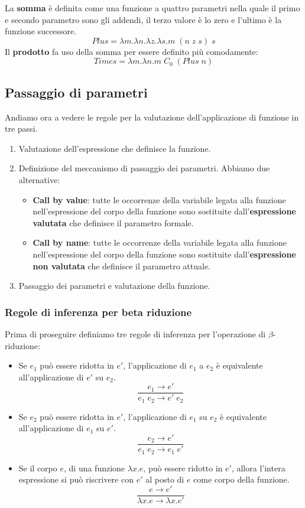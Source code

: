 La \textbf{somma} è definita come una funzione a quattro parametri nella quale il primo e secondo parametro sono gli
addendi, il terzo valore è lo zero e l'ultimo è la funzione successore.
\[ Plus = \lambda m.\lambda n.\lambda z.\lambda s. m \; (n \; z \; s) \; s \]
Il \textbf{prodotto} fa uso della somma per essere definito più comodamente:
\[ Times = \lambda m.\lambda n.m \; C_0 \; (Plus \; n) \]

\subsection{Passaggio di parametri}
Andiamo ora a vedere le regole per la valutazione dell'applicazione di funzione in tre passi.
\begin{enumerate}
	\item Valutazione dell'espressione che definisce la funzione.
	\item Definizione del meccanismo di passaggio dei parametri. Abbiamo due alternative:
	      \begin{itemize}
		      \item \textbf{Call by value}: tutte le occorrenze della variabile legata alla funzione nell'espressione
		            del corpo della funzione sono sostituite dall'\textbf{espressione valutata} che definisce il
		            parametro formale.
		      \item \textbf{Call by name}: tutte le occorrenze della variabile legata alla funzione nell'espressione
		            del corpo della funzione sono sostituite dall'\textbf{espressione non valutata} che definisce il
		            parametro attuale.
	      \end{itemize}
	\item Passaggio dei parametri e valutazione della funzione.
\end{enumerate}

\subsubsection{Regole di inferenza per beta riduzione}
Prima di proseguire definiamo tre regole di inferenza per l'operazione di $\beta$-riduzione:
\begin{itemize}
	\item Se $e_1$ può essere ridotta in $e'$, l'applicazione di $e_1$ a $e_2$ è equivalente all'applicazione di $e'$
	      su $e_2$.
	      \[ \frac{e_1 \rightarrow e'}{e_1 \; e_2 \rightarrow e' \; e_2} \]
	\item Se $e_2$ può essere ridotta in $e'$, l'applicazione di $e_1$ su $e_2$ è equivalente all'applicazione di $e_1$
	      su $e'$.
	      \[ \frac{e_2 \rightarrow e'}{e_1 \; e_2 \rightarrow e_1 \; e'} \]
	\item Se il corpo $e$, di una funzione $\lambda x.e$, può essere ridotto in $e'$, allora l'intera espressione si
	      può riscrivere con $e'$ al posto di $e$ come corpo della funzione.
	      \[ \frac{e \rightarrow e'}{\lambda x.e \rightarrow \lambda x.e'} \]
\end{itemize}

